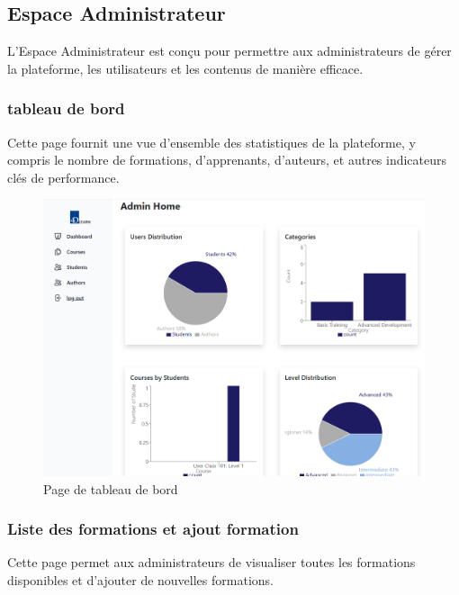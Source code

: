 \subsection{Espace Administrateur}

L'Espace Administrateur est conçu pour permettre aux administrateurs de gérer la plateforme, les utilisateurs et les contenus de manière efficace.

\subsubsection{ tableau de bord}

Cette page fournit une vue d'ensemble des statistiques de la plateforme, y compris le nombre de formations, d'apprenants, d'auteurs, et autres indicateurs clés de performance.

\begin{figure}[H]
    \centering
    \includegraphics[width=19cm]{Figures/dashboard.png}
    \caption{ Page de tableau de bord}
\end{figure}

\subsubsection{Liste des formations et ajout formation}

Cette page permet aux administrateurs de visualiser toutes les formations disponibles et d'ajouter de nouvelles formations.

